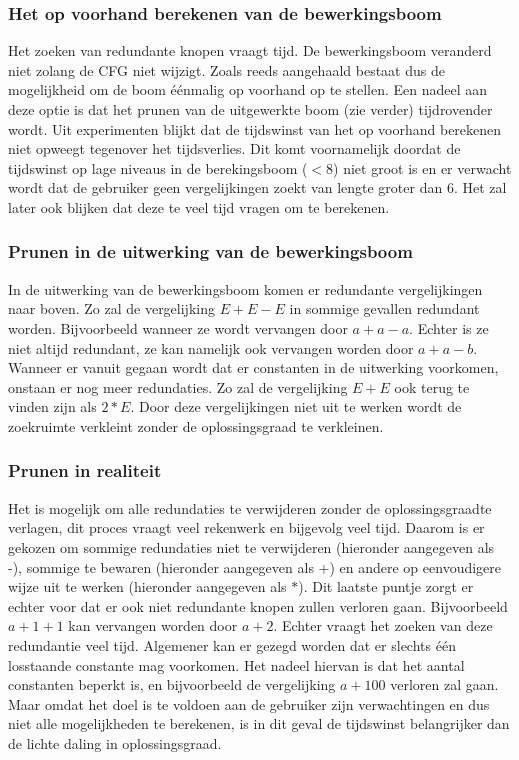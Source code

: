\documentclass[Main.tex]{subfiles}
\begin{document}
\subsubsection*{Het op voorhand berekenen van de bewerkingsboom}
Het zoeken van redundante knopen vraagt tijd. De bewerkingsboom veranderd niet zolang de CFG niet wijzigt. Zoals reeds aangehaald bestaat dus de mogelijkheid om de boom \'e\'enmalig op voorhand op te stellen. Een nadeel aan deze optie is dat het prunen van de uitgewerkte boom (zie verder) tijdrovender wordt. Uit experimenten blijkt dat de tijdswinst van het op voorhand berekenen niet opweegt tegenover het tijdsverlies. Dit komt voornamelijk doordat de tijdswinst op lage niveaus in de berekingsboom ($< 8$) niet groot is en er verwacht wordt dat de gebruiker geen vergelijkingen zoekt van lengte groter dan 6. Het zal later ook blijken dat deze te veel tijd vragen om te berekenen. 

\subsubsection*{Prunen in de uitwerking van de bewerkingsboom}
In de uitwerking van de bewerkingsboom komen er redundante vergelijkingen naar boven. Zo zal de vergelijking $E+E-E$ in sommige gevallen redundant worden. Bijvoorbeeld wanneer ze wordt vervangen door $a+a-a$. Echter is ze niet altijd redundant, ze kan namelijk ook vervangen worden door $a+a-b$. Wanneer er vanuit gegaan wordt dat er constanten in de uitwerking voorkomen, onstaan er nog meer redundaties. Zo zal de vergelijking $E+E$ ook terug te vinden zijn als $2*E$. Door deze vergelijkingen niet uit te werken wordt de zoekruimte verkleint zonder de oplossingsgraad te verkleinen.

\subsubsection*{Prunen in realiteit}
Het is mogelijk om alle redundaties te verwijderen zonder de oplossingsgraad\footnotemark[\ref{note:oplossingsgraad}] te verlagen, dit proces vraagt veel rekenwerk en bijgevolg veel tijd. Daarom is er gekozen om sommige redundaties niet te verwijderen (hieronder aangegeven als -), sommige te bewaren (hieronder aangegeven als +) en andere op eenvoudigere wijze uit te werken (hieronder aangegeven als $\ast$). Dit laatste puntje zorgt er echter voor dat er ook niet redundante knopen zullen verloren gaan. Bijvoorbeeld $a+1+1$ kan vervangen worden door $a+2$. Echter vraagt het zoeken van deze redundantie veel tijd. Algemener kan er gezegd worden dat er slechts \'e\'en losstaande constante mag voorkomen. Het nadeel hiervan is dat het aantal constanten beperkt is, en bijvoorbeeld de vergelijking $a+100$ verloren zal gaan. Maar omdat het doel is te voldoen aan de gebruiker zijn verwachtingen en dus niet alle mogelijkheden te berekenen, is in dit geval de tijdswinst belangrijker dan de lichte daling in oplossingsgraad\footnotemark[\ref{note:oplossingsgraad}].
\end{document}
